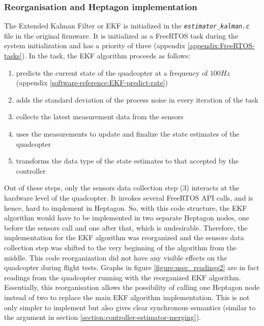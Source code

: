 \documentclass[10pt, a4paper]{article}
\newcommand{\textFunc}[1]{\texttt{\textit{#1}}}
\begin{document}
    \subsubsection{Reorganisation and Heptagon implementation}
    The Extended Kalman Filter or EKF is initialized in the \textFunc{estimator\_kalman.c} file in the original firmware. It is initialized as a FreeRTOS task during the system initialization and has a priority of three (appendix \ref{appendix:FreeRTOS-tasks}). In the task, the EKF algorithm proceeds as follows:
    \begin{enumerate}
        \itemsep 0em
        \item predicts the current state of the quadcopter at a frequency of $100Hz$ (appendix \ref{software-reference:EKF-predict-rate})
        \item adds the standard deviation of the process noise in every iteration of the task
        \item collects the latest measurement data from the sensors 
        \item uses the measurements to update and finalize the state estimates of the quadcopter
        \item transforms the data type of the state estimates to that accepted by the controller
    \end{enumerate}
    Out of these steps, only the sensors data collection step ($3$) interacts at the hardware level of the quadcopter. It invokes several FreeRTOS API calls, and is hence, hard to implement in Heptagon. So, with this code structure, the EKF algorithm would have to be implemented in two separate Heptagon nodes, one before the sensors call and one after that, which is undesirable. Therefore, the implementation for the EKF algorithm was reorganized  and the sensors data collection step was shifted to the very beginning of the algorithm from the middle. This code reorganization did not have any visible effects on the quadcopter during flight tests. Graphs in figure \ref{figure:usec_readings2} are in fact readings from the quadcopter running with the reorganized EKF algorithm. Essentially, this reorganisation allows the possibility of calling one Heptagon node instead of two to replace the main EKF algorithm implementation. This is not only simpler to implement but also gives clear synchronous semantics (similar to the argument in section \ref{section:controller-estimator-merging}).
\end{document}
